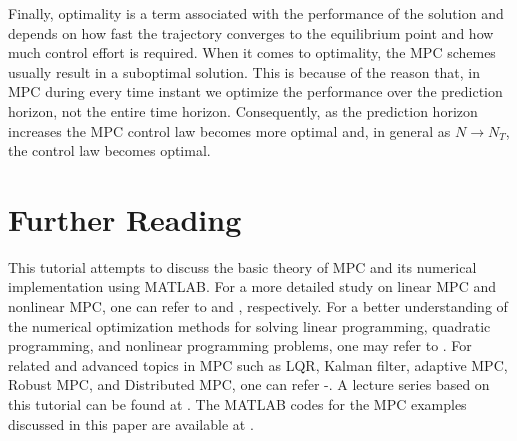 \documentclass{article}
\begin{document}
\par Finally, optimality is a term associated with the performance of the solution and depends on how fast the trajectory converges to the equilibrium point and how much control effort is required.
When it comes to optimality, the MPC schemes usually result in a suboptimal solution. This is because of the reason that, in MPC during every time instant we optimize the performance over the prediction horizon, not the entire time horizon. Consequently, as the prediction horizon increases the MPC control law becomes more optimal and, in general as $N \rightarrow N_T$, the control law becomes optimal.
\section{Further Reading}
This tutorial attempts to discuss the basic theory of MPC and its numerical implementation using MATLAB. For a more detailed study on linear MPC and nonlinear MPC, one can refer to \cite{bFA} and \cite{bLJ}, respectively. For a better understanding of the numerical optimization methods for solving linear programming, quadratic programming, and nonlinear programming problems, one may refer to \cite{bDY}.
For related and advanced topics in MPC such as LQR, Kalman filter,   adaptive MPC, Robust MPC, and Distributed MPC, one can refer \cite{bDM}-\cite{bMA1}.
A lecture series based on this tutorial can be found at \cite{bMA2}.
The MATLAB codes for the MPC examples discussed in this paper are available at \cite{bMA3}.
  
\end{document}
